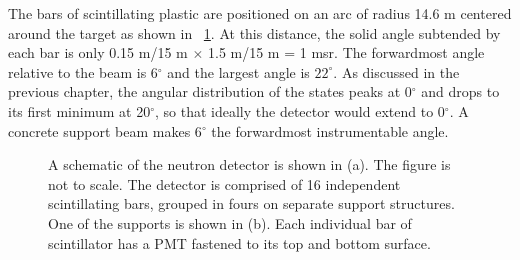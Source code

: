 The bars of scintillating plastic are positioned on an arc of radius 14.6 m centered around the target as shown in {\fig}~\ref{fig:detectorGeometry}.   At this distance, the solid angle subtended by each bar is only 0.15 m/15 m $\times$ 1.5 m/15 m = 1 msr.  The forwardmost angle relative to the beam is 6$^{\circ}$ and the largest angle is $22^{\circ}$.  As discussed in the previous chapter, the angular distribution of the \zp states peaks at 0$^{\circ}$ and drops to its first minimum at 20$^{\circ}$, so that ideally the detector would extend to 0$^{\circ}$.  A concrete support beam makes 6$^{\circ}$ the forwardmost instrumentable angle.
\begin{figure}[htp]
\centering
{}
\qquad
{}
\caption[A schematic of the neutron detector and its supporting structure.]{A schematic of the neutron detector is shown in (a).  The figure is not to scale.  The detector is comprised of 16 independent scintillating bars, grouped in fours on separate support structures.  One of the supports is shown in (b).  Each individual bar of scintillator has a PMT fastened to its top and bottom surface.}
\label{fig:detectorGeometry}
\end{figure}

